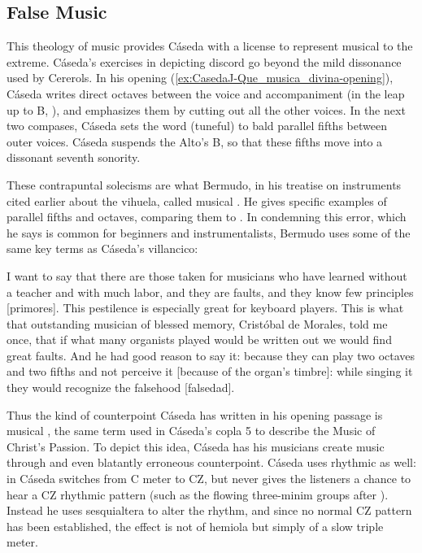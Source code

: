 \subsection{False Music}

This theology of music provides Cáseda with a license to represent musical  to the extreme.
Cáseda's exercises in depicting discord go beyond the mild dissonance used by Cererols.
In his opening (\cref{ex:CasedaJ-Que_musica_divina-opening}), Cáseda writes direct octaves between the voice and accompaniment (in the leap up to B\fl, ), and emphasizes them by cutting out all the other voices.
In the next two compases, Cáseda sets the word  (tuneful) to bald parallel fifths between outer voices.
Cáseda suspends the Alto's B\fl, so that these fifths move into a dissonant seventh sonority.

These contrapuntal solecisms are what Bermudo, in his treatise on instruments cited earlier about the vihuela, called musical .
He gives specific examples of parallel fifths and octaves, comparing them to .
In condemning this error, which he says is common for beginners and instrumentalists, Bermudo uses some of the same key terms as Cáseda's villancico:

\begin{quoting}
I want to say that there are those taken for musicians who have learned without a teacher and with much labor, and they are faults, and they know few principles [primores]. 
This pestilence is especially great for keyboard players. 
This is what that outstanding musician of blessed memory, Cristóbal de Morales, told me once, that if what many organists played would be written out we would find great faults. 
And he had good reason to say it: because they can play two octaves and two fifths and not perceive it [because of the organ's timbre]: while singing it they would recognize the falsehood [falsedad].%
        \autocite[f.~128v]{Bermudo:Declaracion}
\end{quoting}

Thus the kind of counterpoint Cáseda has written in his opening passage is musical , the same term used in Cáseda's copla 5 to describe the Music of Christ's Passion.
To depict this idea, Cáseda has his musicians create  music through  and even blatantly erroneous counterpoint.
Cáseda uses rhythmic  as well: in  Cáseda switches from C meter to CZ, but never gives the listeners a chance to hear a  CZ  rhythmic pattern (such as the flowing three-minim groups after ). 
Instead he uses sesquialtera to alter the rhythm, and since no normal CZ  pattern has been established, the effect is not of hemiola but simply of a slow triple meter.

